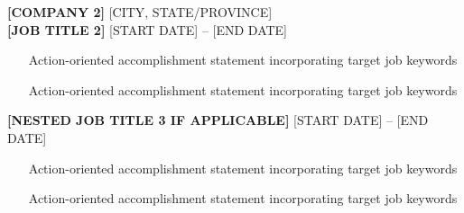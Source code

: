 \documentclass[10pt,letterpaper]{article}
\begin{document}
\textbf{[COMPANY 2]} \hfill [CITY, STATE/PROVINCE] \\
{\small\textbf{[JOB TITLE 2]}} \hfill [START DATE] -- [END DATE]
\begin{itemize}
    \item [Action-oriented accomplishment statement incorporating target job keywords]
    \item [Action-oriented accomplishment statement incorporating target job keywords]
\end{itemize}

{\small\textbf{[NESTED JOB TITLE 3 IF APPLICABLE]}} \hfill [START DATE] -- [END DATE]
\begin{itemize}
    \item [Action-oriented accomplishment statement incorporating target job keywords]
    \item [Action-oriented accomplishment statement incorporating target job keywords]
\end{itemize}
\end{document}
